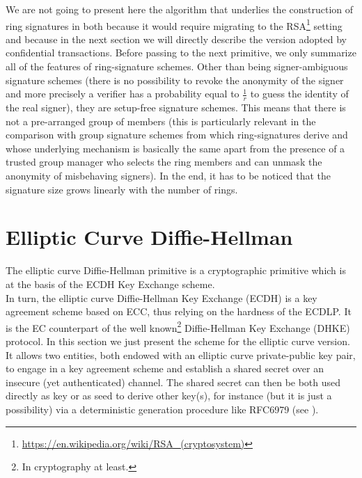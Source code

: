 We are not going to present here the algorithm that underlies the construction of ring signatures in \cite{LeakSecret} both because it would require migrating to the RSA\footnote{\url{https://en.wikipedia.org/wiki/RSA_(cryptosystem)}} setting and because in the next section we will directly describe the version adopted by confidential transactions. Before passing to the next primitive, we only summarize all of the features of ring-signature schemes. Other than being signer-ambiguous signature schemes (there is no possibility to revoke the anonymity of the signer and more precisely a verifier has a probability equal to $\frac{1}{r}$ to guess the identity of the real signer), they are setup-free signature schemes. This means that there is not a pre-arranged group of members (this is particularly relevant in the comparison with group signature schemes from which ring-signatures derive and whose underlying mechanism is basically the same apart from the presence of a trusted group manager who selects the ring members and can unmask the anonymity of misbehaving signers). In the end, it has to be noticed that the signature size grows linearly with the number of rings.

\section{Elliptic Curve Diffie-Hellman}
\label{ECDH}
The elliptic curve Diffie-Hellman primitive is a cryptographic primitive which is at the basis of the ECDH Key Exchange scheme.\\
In turn, the elliptic curve Diffie-Hellman Key Exchange (ECDH) is a key agreement scheme based on ECC, thus relying on the hardness of the ECDLP. It is the EC counterpart of the well known\footnote{In cryptography at least.} Diffie-Hellman Key Exchange (DHKE) protocol. In this section we just present the scheme for the elliptic curve version.\\
It allows two entities, both endowed with an elliptic curve private-public key pair, to engage in a key agreement scheme and establish a shared secret over an insecure (yet authenticated) channel. The shared secret can then be both used directly as key or as seed to derive other key(s), for instance (but it is just a possibility) via a deterministic generation procedure like RFC6979 (see \cite{rfc6979}).
